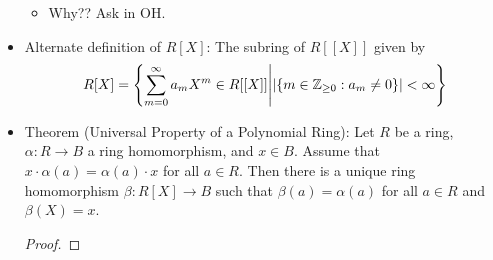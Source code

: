 \documentclass[../notes.tex]{subfiles}
\begin{document}
\begin{itemize}
    \begin{itemize}
        \item Why?? Ask in OH.
    \end{itemize}
    \item Alternate definition of $R[X]$: The subring of $R[[X]]$ given by
    \begin{equation*}
        R[X] = \left\{ \sum_{m=0}^\infty a_mX^m\in R[[X]] \middle| |\{m\in{\mathbb{Z}_{\geq 0}}:a_m\neq 0\}|<\infty \right\}
    \end{equation*}
    \item Theorem (Universal Property of a Polynomial Ring): Let $R$ be a ring, $\alpha:R\to B$ a ring homomorphism, and $x\in B$. Assume that $x\cdot\alpha(a)=\alpha(a)\cdot x$ for all $a\in R$. Then there is a unique ring homomorphism $\beta:R[X]\to B$ such that $\beta(a)=\alpha(a)$ for all $a\in R$ and $\beta(X)=x$.
    \begin{proof}


\end{proof}
\end{itemize}
\end{document}
